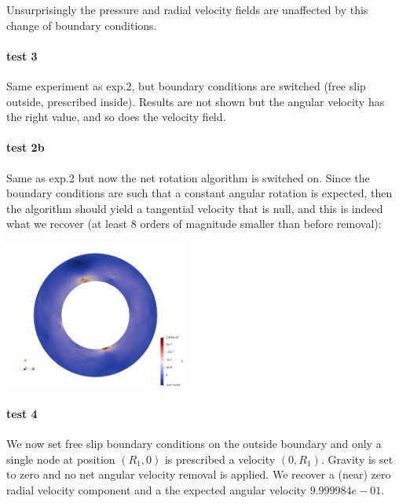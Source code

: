 Unsurprisingly the pressure and radial velocity fields are unaffected by this 
change of boundary conditions.

\paragraph{test 3} Same experiment as exp.2, but boundary conditions are switched
(free slip outside, prescribed inside).
Results are not shown but the angular velocity has the right value, and so does the 
velocity field. 


\paragraph{test 2b} Same as exp.2 but now the net rotation algorithm is switched on. 
Since the boundary conditions are such that a constant angular rotation is expected, 
then the algorithm should yield a tangential velocity that is null, and this is indeed
what we recover (at least 8 orders of magnitude smaller than before removal):

\begin{center}
\includegraphics[width=6cm]{python_codes/fieldstone_33/results_test2b/vt}
\end{center}

\paragraph{test 4} We now set free slip boundary conditions on the outside boundary and 
only a single node at position $(R_1,0)$ is prescribed a velocity $(0,R_1)$. Gravity is set to zero 
and no net angular velocity removal is applied.
We recover a (near) zero radial velocity component and a the expected angular velocity 
$9.999984e-01$. 

